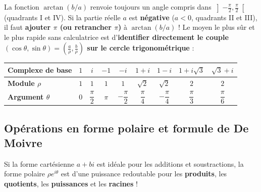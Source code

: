 \begin{attention}[Ne calculez JAMAIS $\theta = \arctan(b/a)$ les yeux fermés sans regarder le quadrant !]
La fonction $\arctan(b/a)$ renvoie toujours un angle compris dans $\left]-\frac{\pi}{2}, \frac{\pi}{2}\right[$ (quadrants I et IV). Si la partie réelle $a$ est \textbf{négative} ($a < 0$, quadrants II et III), il faut \textbf{ajouter $\pi$ (ou retrancher $\pi$)} à $\arctan(b/a)$ !
Le moyen le plus sûr et le plus rapide sans calculatrice est d'\textbf{identifier directement le couple $(\cos\theta, \sin\theta) = \left(\frac{a}{\rho}, \frac{b}{\rho}\right)$ sur le cercle trigonométrique} :
\begin{center}
\renewcommand{\arraystretch}{1.45}
\begin{tabular}{@{}lcccccccc@{}}
\toprule
\textbf{Complexe de base} & $1$ & $i$ & $-1$ & $-i$ & $1 + i$ & $1 - i$ & $1 + i\sqrt{3}$ & $\sqrt{3} + i$ \\
\midrule
\textbf{Module $\rho$} & $1$ & $1$ & $1$ & $1$ & $\sqrt{2}$ & $\sqrt{2}$ & $2$ & $2$ \\
\textbf{Argument $\theta$} & $0$ & $\dfrac{\pi}{2}$ & $\pi$ & $-\dfrac{\pi}{2}$ & $\dfrac{\pi}{4}$ & $-\dfrac{\pi}{4}$ & $\dfrac{\pi}{3}$ & $\dfrac{\pi}{6}$ \\
\bottomrule
\end{tabular}
\end{center}
\end{attention}

\subsection{Opérations en forme polaire et formule de De Moivre}

Si la forme cartésienne $a + bi$ est idéale pour les additions et soustractions, la forme polaire $\rho e^{i\theta}$ est d'une puissance redoutable pour les \textbf{produits}, les \textbf{quotients}, les \textbf{puissances} et les \textbf{racines} !

